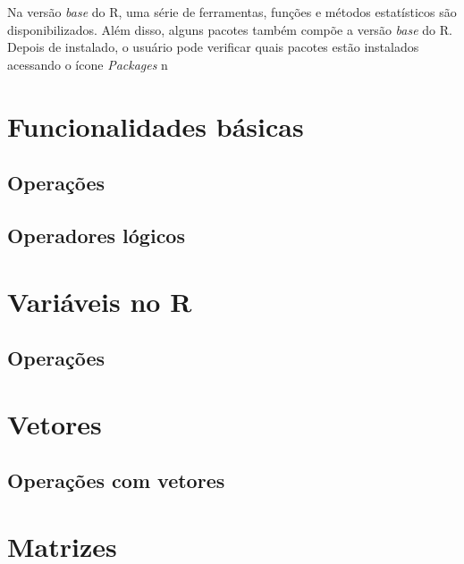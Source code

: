 \documentclass[
]{book}
\begin{document}
Na versão \emph{base} do R, uma série de ferramentas, funções e métodos estatísticos são disponibilizados. Além disso, alguns pacotes também compõe a versão \emph{base} do R. Depois de instalado, o usuário pode verificar quais pacotes estão instalados acessando o ícone \emph{Packages} n

\hypertarget{funcionalidades-buxe1sicas}{%
\section{Funcionalidades básicas}\label{funcionalidades-buxe1sicas}}

\hypertarget{operauxe7uxf5es}{%
\subsection{Operações}\label{operauxe7uxf5es}}

\hypertarget{operadores-luxf3gicos}{%
\subsection{Operadores lógicos}\label{operadores-luxf3gicos}}

\hypertarget{variuxe1veis-no-r}{%
\section{Variáveis no R}\label{variuxe1veis-no-r}}

\hypertarget{operauxe7uxf5es-1}{%
\subsection{Operações}\label{operauxe7uxf5es-1}}

\hypertarget{vetores}{%
\section{Vetores}\label{vetores}}

\hypertarget{operauxe7uxf5es-com-vetores}{%
\subsection{Operações com vetores}\label{operauxe7uxf5es-com-vetores}}

\hypertarget{matrizes}{%
\section{Matrizes}\label{matrizes}}
\end{document}
